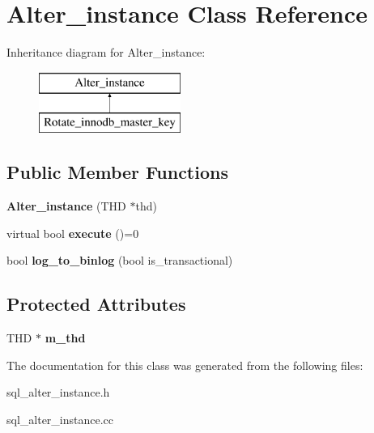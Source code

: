 \hypertarget{classAlter__instance}{}\section{Alter\+\_\+instance Class Reference}
\label{classAlter__instance}
Inheritance diagram for Alter\+\_\+instance\+:\begin{figure}[H]
\begin{center}
\leavevmode
\includegraphics[height=2.000000cm]{classAlter__instance}
\end{center}
\end{figure}
\subsection*{Public Member Functions}
\begin{DoxyCompactItemize}
\item 
\mbox{\label{classAlter__instance_af3412d92f8221a23f35395f167a0a824}} 
{\bfseries Alter\+\_\+instance} (T\+HD $\ast$thd)
\item 
\mbox{\label{classAlter__instance_a24cf68b2da80fe9e95783e6c857cbd47}} 
virtual bool {\bfseries execute} ()=0
\item 
\mbox{\label{classAlter__instance_a8884a240ed23b93f9bc5b7daf4701e77}} 
bool {\bfseries log\+\_\+to\+\_\+binlog} (bool is\+\_\+transactional)
\end{DoxyCompactItemize}
\subsection*{Protected Attributes}
\begin{DoxyCompactItemize}
\item 
\mbox{\label{classAlter__instance_aa8d199e243b23deeaeda790f8a4a0115}} 
T\+HD $\ast$ {\bfseries m\+\_\+thd}
\end{DoxyCompactItemize}


The documentation for this class was generated from the following files\+:\begin{DoxyCompactItemize}
\item 
sql\+\_\+alter\+\_\+instance.\+h\item 
sql\+\_\+alter\+\_\+instance.\+cc\end{DoxyCompactItemize}
